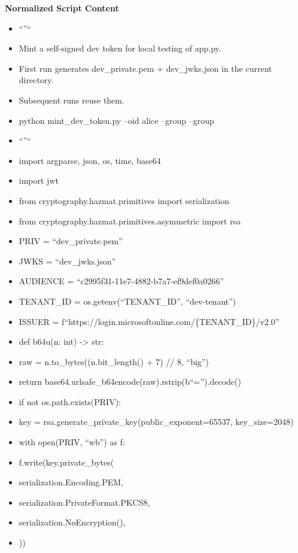 \documentclass[11pt]{article}
\begin{document}
\textbf{Normalized Script Content}
\begin{itemize}[leftmargin=*,itemsep=2pt,topsep=2pt]
\item {} ``''``
\item {} Mint a self-signed dev token for local testing of app.py.
\item {} First run generates dev\_\allowbreak{}private.pem + dev\_\allowbreak{}jwks.json in the current directory.
\item {} Subsequent runs reuse them.
\item {} python mint\_\allowbreak{}dev\_\allowbreak{}token.py --oid alice --group --group
\item {} ``''``
\item {} import argparse, json, os, time, base64
\item {} import jwt
\item {} from cryptography.hazmat.primitives import serialization
\item {} from cryptography.hazmat.primitives.asymmetric import rsa
\item {} PRIV = ``dev\_\allowbreak{}private.pem''
\item {} JWKS = ``dev\_\allowbreak{}jwks.json''
\item {} AUDIENCE = ``c2995f31-11e7-4882-b7a7-ef9def0a0266''
\item {} TENANT\_\allowbreak{}ID = os.getenv(``TENANT\_\allowbreak{}ID'', ``dev-tenant'')
\item {} ISSUER = f``https://login.microsoftonline.com/\{TENANT\_\allowbreak{}ID\}/v2.0''
\item {} def b64u(n: int) -> str:
\item {} raw = n.to\_\allowbreak{}bytes((n.bit\_\allowbreak{}length() + 7) // 8, ``big'')
\item {} return base64.urlsafe\_\allowbreak{}b64encode(raw).rstrip(b``='').decode()
\item {} if not os.path.exists(PRIV):
\item {} key = rsa.generate\_\allowbreak{}private\_\allowbreak{}key(public\_\allowbreak{}exponent=65537, key\_\allowbreak{}size=2048)
\item {} with open(PRIV, ``wb'') as f:
\item {} f.write(key.private\_\allowbreak{}bytes(
\item {} serialization.Encoding.PEM,
\item {} serialization.PrivateFormat.PKCS8,
\item {} serialization.NoEncryption(),
\item {} ))

\end{itemize}
\end{document}
